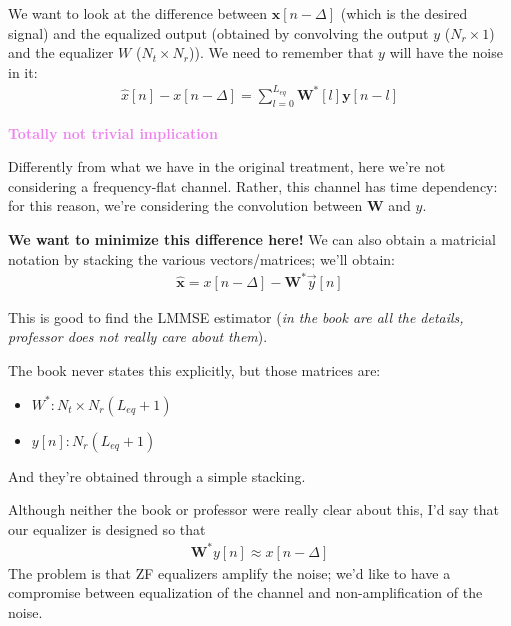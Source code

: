 \documentclass[a4paper, 12pt]{book}
\begin{document}
We want to look at the difference between $\mathbf{x}[n-\Delta]$ (which is the desired signal) and the equalized output (obtained by convolving the output $y$ ($N_r \times 1$) and the equalizer $W$ ($N_t \times N_r$)). We need to remember that $y$ will have the noise in it:
\begin{align}
    \hat{x}[n] - x[n - \Delta] = \sum_{l=0}^{L_{eq}} \mathbf{W}^*[l] \mathbf{y}[n-l] \label{eq:2.159}
\end{align}

\begin{tcolorbox}[colback=violet!5, colframe=violet, boxrule=0.5pt, sharp corners]
    \textbf{\textcolor{violet}{ Totally not trivial implication}}
    \vspace{0.5em}
    
    Differently from what we have in the original treatment, here we're not considering a frequency-flat channel. Rather, this channel has time dependency: for this reason, we're considering the convolution between $\mathbf{W}$ and $y$.
\end{tcolorbox}

\textbf{We want to minimize this difference here!} We can also obtain a matricial notation by stacking the various vectors/matrices; we'll obtain:
\begin{align}
    \mathbf{\hat{x}} = x[n-\Delta] - \mathbf{W}^* \vec{y}[n]
\end{align}

This is good to find the LMMSE estimator (\textit{in the book are all the details, professor does not really care about them}).

\begin{remark}
The book never states this explicitly, but those matrices are:
\begin{itemize}
    \item $W^* : N_t \times N_r (L_{eq} + 1)$
    \item $y[n] : N_r (L_{eq} + 1)$
\end{itemize}
And they're obtained through a simple stacking.
\end{remark}

Although neither the book or professor were really clear about this, I'd say that our equalizer is designed so that
\begin{align}
    \mathbf{W}^* y[n] \approx x[n-\Delta]
\end{align}
The problem is that ZF equalizers amplify the noise; we'd like to have a compromise between equalization of the channel and non-amplification of the noise.
\end{document}
